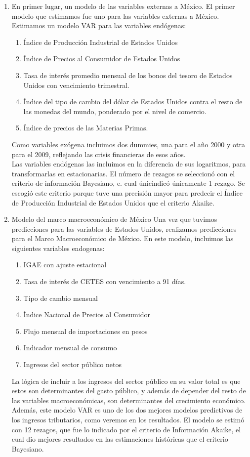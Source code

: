 \documentclass[a4paper, 11pt]{article}
\begin{document}
\begin{enumerate}
\item En primer lugar, un modelo de las variables externas a México.
El primer modelo que estimamos fue uno para las variables externas a México. Estimamos un modelo VAR para las variables endógenas:
\begin{enumerate}
\item Índice de Producción Industrial de Estados Unidos
\item Índice de Precios al Consumidor de Estados Unidos
\item Tasa de interés promedio mensual de los bonos del tesoro de Estados Unidos con vencimiento trimestral.
\item Índice del tipo de cambio del dólar de Estados Unidos contra el resto de las monedas del mundo, ponderado por el nivel de comercio.
\item Índice de precios de las Materias Primas.
\end{enumerate}
Como variables exógena incluimos dos dummies, una para el año 2000 y otra para el 2009, reflejando las crisis financieras de esos años.\\
Las variables endógenas las incluimos en la diferencia de sus logaritmos, para transformarlas en estacionarias. El número de rezagos se seleccionó con el criterio de información Bayesiano, e. cual únicindicó únicamente 1 rezago. Se escogió este criterio porque tuve una precisión mayor para predecir el Índice de Producción Industrial de Estados Unidos que el criterio Akaike.

\item Modelo del marco macroeconómico de México
Una vez que tuvimos predicciones para las variables de Estados Unidos, realizamos predicciones para el Marco Macroeconómico de México. En este modelo, incluimos las siguientes variables endogenas:
\begin{enumerate}
\item IGAE con ajuste estacional
\item Tasa de interés de CETES con vencimiento a 91 días.
\item Tipo de cambio mensual
\item Índice Nacional de Precios al Consumidor
\item Flujo mensual de importaciones en pesos
\item Indicador mensual de consumo
\item Ingresos del sector público netos
\end{enumerate}
La lógica de incluir a los ingresos del sector público en su valor total es que estos son determinantes del gasto público, y además de depender del resto de las variables macroeconómicas, son determinantes del crecimiento económico. Además, este modelo VAR es uno de los dos mejores modelos predictivos de los ingresos tributarios, como veremos en los resultados. El modelo se estimó con 12 rezagos, que fue lo indicado por el criterio de Información Akaike, el cual dio mejores resultados en las estimaciones históricas que el criterio Bayesiano.\\


\end{enumerate}
\end{document}
